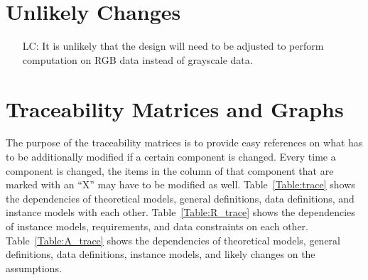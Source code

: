 \documentclass[12pt]{article}
\newcounter{lcnum} %
\begin{document}
\section{Unlikely Changes}    

\noindent \begin{itemize}

\item[LC\refstepcounter{lcnum}\thelcnum\label{RGB_Data}:] It is unlikely that the design 
will need to be adjusted to perform computation on RGB data instead of grayscale data.

\end{itemize}

\section{Traceability Matrices and Graphs}

The purpose of the traceability matrices is to provide easy references on what
has to be additionally modified if a certain component is changed.  Every time a
component is changed, the items in the column of that component that are marked
with an ``X'' may have to be modified as well.  Table~\ref{Table:trace} shows the
dependencies of theoretical models, general definitions, data definitions, and
instance models with each other. Table~\ref{Table:R_trace} shows the
dependencies of instance models, requirements, and data constraints on each
other. Table~\ref{Table:A_trace} shows the dependencies of theoretical models,
general definitions, data definitions, instance models, and likely changes on
the assumptions.



\end{document}
